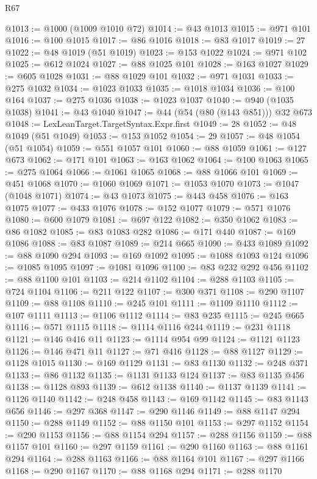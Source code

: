 \begin{lexlean}{R67}
\begin{coremodule}
@1013 := @1000 (@1009 @1010 @72)
@1014 := @43 @1013
@1015 := @971 @101
@1016 := @100 @1015
@1017 := @86 @1016
@1018 := @83 @1017
@1019 := 27
@1022 := @48 @1019 (@51 @1019)
@1023 := @153 @1022
@1024 := @971 @102
@1025 := @612 @1024
@1027 := @88 @1025 @101
@1028 := @163 @1027
@1029 := @605 @1028
@1031 := @88 @1029 @101
@1032 := @971 @1031
@1033 := @275 @1032
@1034 := @1023 @1033
@1035 := @1018 @1034
@1036 := @100 @164
@1037 := @275 @1036
@1038 := @1023 @1037
@1040 := @940 (@1035 @1038)
@1041 := @43 @1040
@1047 := @44 (@54 (@80 (@143 @851))) @32 @673
@1048 := LexLeanTarget.TargetSyntax.Expr.first
@1049 := 28
@1052 := @48 @1049 (@51 @1049)
@1053 := @153 @1052
@1054 := 29
@1057 := @48 @1054 (@51 @1054)
@1059 := @551 @1057 @101
@1060 := @88 @1059
@1061 := @127 @673
@1062 := @171 @101
@1063 := @163 @1062
@1064 := @100 @1063
@1065 := @275 @1064
@1066 := @1061 @1065
@1068 := @88 @1066 @101
@1069 := @451 @1068
@1070 := @1060 @1069
@1071 := @1053 @1070
@1073 := @1047 (@1048 @1071)
@1074 := @43 @1073
@1075 := @443 @458
@1076 := @163 @1075
@1077 := @433 @1076
@1078 := @152 @1077
@1079 := @571 @1076
@1080 := @600 @1079
@1081 := @697 @122
@1082 := @350 @1062
@1083 := @86 @1082
@1085 := @83 @1083 @282
@1086 := @171 @440
@1087 := @169 @1086
@1088 := @83 @1087
@1089 := @214 @665
@1090 := @433 @1089
@1092 := @88 @1090 @294
@1093 := @169 @1092
@1095 := @1088 @1093 @124
@1096 := @1085 @1095
@1097 := @1081 @1096
@1100 := @83 @232 @292 @456
@1102 := @88 @1100 @101
@1103 := @214 @1102
@1104 := @288 @1103
@1105 := @724 @1104
@1106 := @211 @122
@1107 := @300 @371
@1108 := @290 @1107
@1109 := @88 @1108
@1110 := @245 @101
@1111 := @1109 @1110
@1112 := @107 @1111
@1113 := @1106 @1112
@1114 := @83 @235
@1115 := @245 @665
@1116 := @571 @1115
@1118 := @1114 @1116 @244
@1119 := @231 @1118
@1121 := @146 @416 @11
@1123 := @1114 @954 @99
@1124 := @1121 @1123
@1126 := @146 @471 @11
@1127 := @71 @416
@1128 := @88 @1127
@1129 := @1128 @1015
@1130 := @169 @1129
@1131 := @83 @1130
@1132 := @248 @371
@1133 := @86 @1132
@1135 := @1131 @1133 @124
@1137 := @83 @1135 @456
@1138 := @1128 @893
@1139 := @612 @1138
@1140 := @1137 @1139
@1141 := @1126 @1140
@1142 := @248 @458
@1143 := @169 @1142
@1145 := @83 @1143 @656
@1146 := @297 @368
@1147 := @290 @1146
@1149 := @88 @1147 @294
@1150 := @288 @1149
@1152 := @88 @1150 @101
@1153 := @297 @1152
@1154 := @290 @1153
@1156 := @88 @1154 @294
@1157 := @288 @1156
@1159 := @88 @1157 @101
@1160 := @297 @1159
@1161 := @290 @1160
@1163 := @88 @1161 @294
@1164 := @288 @1163
@1166 := @88 @1164 @101
@1167 := @297 @1166
@1168 := @290 @1167
@1170 := @88 @1168 @294
@1171 := @288 @1170

\end{coremodule}
\end{lexlean}
